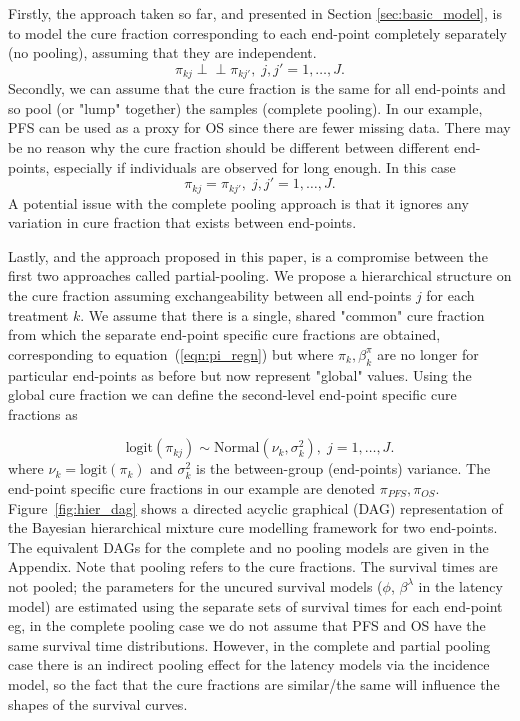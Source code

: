 \documentclass[AMA,STIX1COL]{WileyNJD-v2}
\begin{document}
Firstly, the approach taken so far, and presented in Section \ref{sec:basic_model}, is to model the cure fraction corresponding to each end-point completely separately (no pooling), assuming that they are independent.
$$
\pi_{kj} \perp\!\!\!\perp \pi_{kj'}, \; j,j' = 1, \ldots, J.
$$
Secondly, we can assume that the cure fraction is the same for all end-points and so pool (or "lump" together) the samples (complete pooling).
In our example, PFS can be used as a proxy for OS since there are fewer missing data.
There may be no reason why the cure fraction should be different between different end-points, especially if individuals are observed for long enough.
In this case
$$
\pi_{kj} = \pi_{kj'}, \; j,j' = 1, \ldots, J.
$$
A potential issue with the complete pooling approach is that it ignores any variation in cure fraction that exists between end-points.

Lastly, and the approach proposed in this paper, is a compromise between the first two approaches called partial-pooling.
We propose a hierarchical structure on the cure fraction assuming exchangeability between all end-points $j$ for each treatment $k$.
We assume that there is a single, shared "common" cure fraction from which the separate end-point specific cure fractions are obtained, corresponding to equation~(\ref{eqn:pi_regn})
but where $\pi_{k}, \beta^{\pi}_{k}$ are no longer for particular end-points as before but now represent "global" values.
Using the global cure fraction we can define the second-level end-point specific cure fractions as

\begin{equation}\label{eqn:global_cf}
\text{logit}(\pi_{kj}) \sim \text{Normal}(\nu_k, \sigma_k^2), \; j = 1, \ldots, J.  
\end{equation}
\noindent
where $\nu_k = \text{logit}(\pi_k)$ and $\sigma_k^2$ is the between-group (end-points) variance.
The end-point specific cure fractions in our example are denoted $\pi_{PFS}, \pi_{OS}$.
Figure~\ref{fig:hier_dag} shows a directed acyclic graphical (DAG) representation of the Bayesian hierarchical mixture cure modelling framework for two end-points.
The equivalent DAGs for the complete and no pooling models are given in the Appendix.
Note that pooling refers to the cure fractions. The survival times are not pooled; the parameters for the uncured survival models ($\phi$, $\beta^{\lambda}$ in the latency model) are estimated using the separate sets of survival times for each end-point
eg, in the complete pooling case we do not assume that PFS and OS have the same survival time distributions.
However, in the complete and partial pooling case there is an indirect pooling effect for the latency models via the incidence model, so the fact that the cure fractions are similar/the same will influence the shapes of the survival curves.
\end{document}
